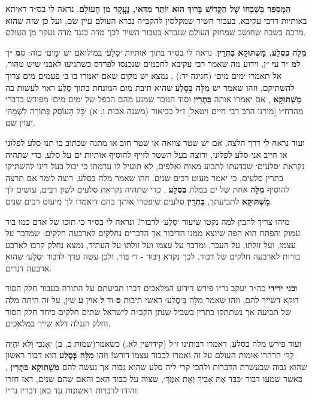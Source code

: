 \documentclass[12pt, openany]{book}
\newcommand{\sethebfont}{
\fontsize{10.5pt}{13.1pt} \selectfont
}
\newcommand{\textblock}[1]{
{\sethebfont #1\\}	
}
\begin{document}
\textblock{\textbf{הַמְסַפֵּר בְּשִׁבְחוֹ שֶׁל הַקָּדוֹשׁ בָּרוּךְ הוּא יוֹתֵר מִדַּאי, נֶעֱקָר מִן הָעוֹלָם}. נראה לי בס״ד דאיתא באותיות דרבי עקיבא, בעבור השיר שמקלסין להקב״ה נברא העולם עיין שם, ועל כן שזה שהוא מרבה בשבח שחושב שמחזק העולם שנברא בעבור השיר לכך מדה כנגד מדה נעקר מן העולם.}
\textblock{\textbf{מִלָּה בְּסֶלַע, מַשְׁתּוּקָא בִּתְרֵין}. נראה לי בס״ד בתוך אותיות ׳סֶלַע׳ במילואם יש ׳מַיִם׳ כזה: ס\textbf{מ} ״ך ל\textbf{מ} ״ד ע\textbf{י} ״ן, וידוע מה שאמר רבי עקיבא לחכמים שנכנסו לפרדס כשתגיעו לאבני שיש טהור, אל תאמרו ׳מים מים׳ {\small (חגיגה יד:)} , נמצא יש מקום שאם יאמרו בו ב׳ פעמים מים צרוך להשתיקם, וזהו שאמר יש \textbf{מִלָּה בְּסֶלַע} שהיא תיבת מַיִם המונחת בתוך סֶלַע ראוי לעשות בה \textbf{מַשְׁתּוּקָא} , אם יאמרו אותה \textbf{בִּתְרֵין} וסוד הנזכר שמנע מהם הכפל של ׳מים מים׳ מפורש בדברי מהרח״ו {\small [מורנו הרב רבי חיים ויטאל]} ז״ל בביאור {\small (משנה אבות ו, א)} ׳כָּל הָעוֹסֵק בַּתּוֹרָה לִשְׁמָהּ׳ יעוין שם.\par ועוד נראה לי דרך הלצה, אם יש שטר צוואה או שטר חוב או מתנה שכתוב בו תנו סלע לפלוני או חייב אני סלע לפלוני, ורוצה בעל השטר לזייף להוסיף אותיות ים על סלע, כדי שתהיה נקראת ׳סלעים׳ שבדעתו לתבוע מאות ואלפים, לא תועיל לו ערמתו כי יכול בעל דינו להשתיקו בתרין סלעים, כי יאמר מעוט רבים שנים. וזהו שאמר מלה בסלע, רוצה לומר אם תרצה להוסיף \textbf{מִלָּה} אחת של ים במלת \textbf{בְּסֶלַע} , כדי שתהיה נקראת סלעים לשון רבים, עושים לך \textbf{מַשְׁתּוּקָא} לתביעתך, \textbf{בִּתְרֵין} סלעים שיפטרו אותך בהם דיאמרו לך מיעוט רבים שנים.\par מיהו צריך להבין למה נקטו שיעור ׳סֶלַע׳ לדבור? ונראה לי בס״ד כי תוכו של אדם כמו בור עמוק והפתח הוא הפה שיוצא ממנו הדיבור אך הדברים נחלקים לארבעה חלקים: שמדבר על עצמו, ועל זולתו, על העבר, ומדבר על עצמו ועל זולתו על העתיד, נמצא נחלק קרבו לארבע בורות לארבעה חלקים של דבור, לכך נקרא דִּבּוּר - ד׳ בּוֹר, ולכן עשה ערך לדבור ׳סֶלַע׳ שהוא ארבעה דנרים.\par \textbf{ובני ידידי} כה״ר יעקב נר״ו פירש דידוע המלאכים דברו תביעתם על התורה בעבור חלק הסוד דוקא דשייך להם, וזהו שאמר מִלָּה בְּ׳סֶלַע׳ ראשי תיבות \textbf{ס} וד \textbf{ל} אוין \textbf{ע} שין, על זה היתה מלה של תביעה אך נשתתקו בתרין בשביל שנתן הקב״ה לישראל שתים חלקים ביחד חלק הסוד וחלק הנגלה דלא שייך במלאכים.\par ועוד פירש מלה בסלע, דאמרו רבותינו ז״ל {\small (קידושין לא.)} כשאמר{\small (שמות כ, ב)} ׳אָנֹכִי וְלֹא יִהְיֶה לְךָ׳ הרהרו אומות העולם על זה ואמרו לכבוד עצמו דורש! וזהו \textbf{מִלָּה בְּסֶלַע} הוא דבור ראשון שהוא גבוה שבעשרת הדברות ולהכי קרי ליה סלע שהוא גבוה אך נעשה להם \textbf{מַשְׁתּוּקָא בִּתְרֵין} , כאשר שמעו דבור ׳כַּבֵּד אֶת אָבִיךָ וְאֶת אִמֶּךָ׳, שצוה על כבוד האב והאם שהם שנים, דאז חזרו והודו לדברות ראשונות עד כאן דבריו נר״ו.}
\end{document}
